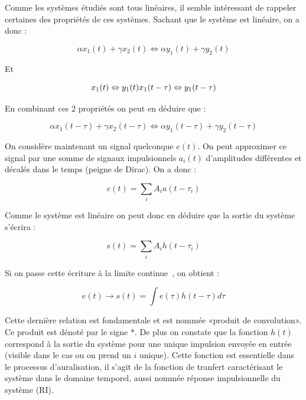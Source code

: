 Comme les systèmes étudiés sont tous linéaires, il semble intéressant de  rappeler certaines des propriétés de ces systèmes.  
Sachant que le système est linéaire, on a donc :

\begin{equation}
    \alpha x_1(t) + \gamma x_2(t) \Leftrightarrow \alpha y_1(t) + \gamma y_2(t)
\end{equation}

Et

\begin{equation}     
    x_1(t)  \Leftrightarrow y_1(t)\\
    x_1(t -\tau) \Leftrightarrow y_1(t -\tau)                
\end{equation}

En combinant ces 2 propriétés on peut en déduire que :

\begin{equation}       
    \alpha x_1(t - \tau) + \gamma x_2(t - \tau) \Leftrightarrow \alpha y_1(t - \tau) + \gamma y_2(t - \tau)       
\end{equation}

On considère maintenant un signal quelconque $e(t)$. On peut approximer ce signal par une somme de signaux impulsionnels
$a_i(t)$ d'amplitudes différentes et décalés dans le temps (peigne de Dirac).
On a donc :

\begin{equation}        
    e(t) = \sum_{i} A_i a(t - \tau_i)
\end{equation}

Comme le système est linéaire on peut donc en déduire que la sortie du système s'écrira :

\begin{equation}        
    s(t) = \sum_{i} A_i h(t - \tau_i)
\end{equation}

Si on passe cette écriture à la limite continue~\cite{Mar12}, on obtient :

\begin{equation}        
    e(t) \to s(t) = \int e(\tau)h(t -\tau)d\tau
\end{equation}

Cette dernière relation est fondamentale et est nommée «produit de convolution». Ce produit est dénoté par le signe $\ast$.
De plus on constate que la fonction $h(t)$ correspond à la sortie du système pour une unique impulsion envoyée en entrée
(visible dans le cas ou on prend un $i$ unique).
Cette fonction est essentielle dans le processus d'auralisation, il s'agit de la fonction de tranfert caractérisant le système dans le domaine temporel, aussi nommée réponse impulsionnelle du système (RI).


